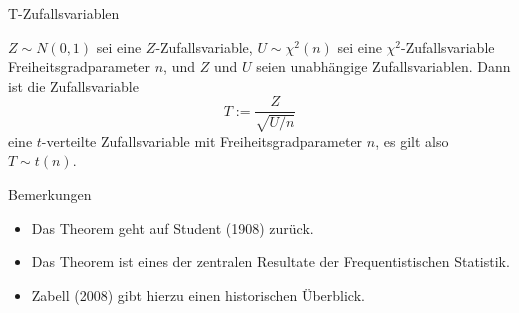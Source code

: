\documentclass[
  8pt,
  ignorenonframetext,
]{beamer}
\providecommand{\tightlist}{%
  \setlength{\itemsep}{0pt}\setlength{\parskip}{0pt}}
\begin{document}
\begin{frame}{T-Zufallsvariablen}
\protect\hypertarget{t-zufallsvariablen-2}{}
\footnotesize
\begin{theorem}[$T$-Transformation]
\justifying
\normalfont
$Z \sim N(0,1)$ sei eine  $Z$-Zufallsvariable, $U \sim \chi^2(n)$ sei eine
$\chi^2$-Zufallsvariable Freiheitsgradparameter $n$, und $Z$ und $U$ seien
unabhängige Zufallsvariablen. Dann ist die Zufallsvariable
\begin{equation}
T := \frac{Z}{\sqrt{U/n}}
\end{equation}
eine $t$-verteilte Zufallsvariable mit Freiheitsgradparameter $n$, es gilt also $T \sim t(n)$.
\end{theorem}

Bemerkungen

\begin{itemize}
\tightlist
\item
  Das Theorem geht auf Student (1908) zurück.
\item
  Das Theorem ist eines der zentralen Resultate der Frequentistischen
  Statistik.
\item
  Zabell (2008) gibt hierzu einen historischen Überblick.
\end{itemize}
\end{frame}
\end{document}

